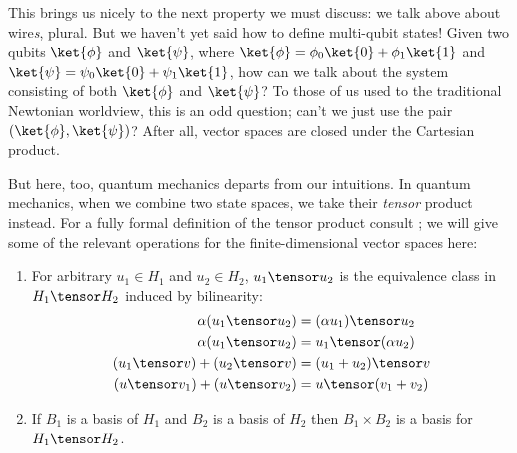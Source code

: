 
This brings us nicely to the next property we must discuss: we talk above about
wire\emph{s}, plural.  But we haven't yet said how to define multi-qubit states!
Given two qubits $\ket{\phi}$ and $\ket{\psi}$, where $\ket{\phi} =
\phi_0\ket{0} + \phi_1\ket{1}$ and $\ket{\psi} = \psi_0\ket{0} + \psi_1\ket{1}$,
how can we talk about the system consisting of both $\ket{\phi}$ and
$\ket{\psi}$?  To those of us used to the traditional Newtonian worldview, this
is an odd question; can't we just use the pair $(\ket{\phi},\ket{\psi})$?  After
all, vector spaces are closed under the Cartesian product.

But here, too, quantum mechanics departs from our intuitions.  In quantum
mechanics, when we combine two state spaces, we take their \emph{tensor} product
instead.  For a fully formal definition of the tensor product
consult \cite{gallier13}; we will give some of the relevant operations for the
finite-dimensional vector spaces here:
\begin{enumerate}
    \item For arbitrary $u_1 \in H_1$ and $u_2 \in H_2$, 
    $u_1 \tensor u_2$ is the equivalence class in $H_1 \tensor H_2$ induced
    by bilinearity:
    \begin{align*}
        \alpha(u_1 \tensor u_2) &= (\alpha u_1) \tensor u_2 \\
        \alpha(u_1 \tensor u_2) &= u_1 \tensor (\alpha u_2) \\
        (u_1 \tensor v) + (u_2 \tensor v) &= (u_1 + u_2) \tensor v \\
        (u \tensor v_1) + (u \tensor v_2) &= u \tensor (v_1 + v_2)
    \end{align*}
    \item If $B_1$ is a basis of $H_1$ and $B_2$ is a basis of $H_2$
    then $B_1 \times B_2$ is a basis for $H_1 \tensor H_2$.
\end{enumerate}

